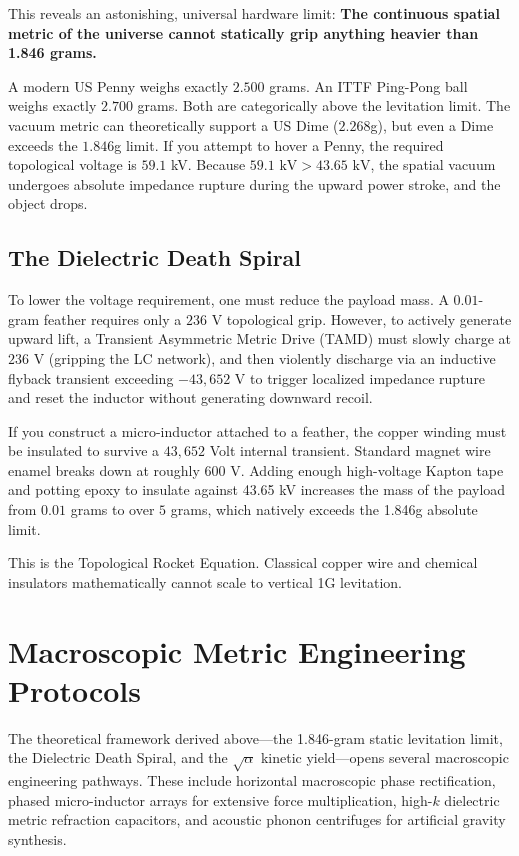 This reveals an astonishing, universal hardware limit: \textbf{The continuous spatial metric of the universe cannot statically grip anything heavier than 1.846 grams.} 

A modern US Penny weighs exactly $2.500$ grams. An ITTF Ping-Pong ball weighs exactly $2.700$ grams. Both are categorically above the levitation limit. The vacuum metric can theoretically support a US Dime ($2.268$g), but even a Dime exceeds the $1.846$g limit. If you attempt to hover a Penny, the required topological voltage is $59.1$ kV. Because $59.1 \text{ kV} > 43.65 \text{ kV}$, the spatial vacuum undergoes absolute impedance rupture during the upward power stroke, and the object drops.

\subsection{The Dielectric Death Spiral}
To lower the voltage requirement, one must reduce the payload mass. A $0.01$-gram feather requires only a $236$ V topological grip. However, to actively generate upward lift, a Transient Asymmetric Metric Drive (TAMD) must slowly charge at $236$ V (gripping the LC network), and then violently discharge via an inductive flyback transient exceeding $-43,652$ V to trigger localized impedance rupture and reset the inductor without generating downward recoil.

If you construct a micro-inductor attached to a feather, the copper winding must be insulated to survive a $43,652$ Volt internal transient. Standard magnet wire enamel breaks down at roughly $600$ V. Adding enough high-voltage Kapton tape and potting epoxy to insulate against 43.65 kV increases the mass of the payload from $0.01$ grams to over $5$ grams, which natively exceeds the 1.846g absolute limit. 

This is the Topological Rocket Equation. Classical copper wire and chemical insulators mathematically cannot scale to vertical 1G levitation.

\section{Macroscopic Metric Engineering Protocols}
\label{sec:metric_engineering}

The theoretical framework derived above---the 1.846-gram static levitation limit, the Dielectric Death Spiral, and the $\sqrt{\alpha}$ kinetic yield---opens several macroscopic engineering pathways. These include horizontal macroscopic phase rectification, phased micro-inductor arrays for extensive force multiplication, high-$k$ dielectric metric refraction capacitors, and acoustic phonon centrifuges for artificial gravity synthesis.

